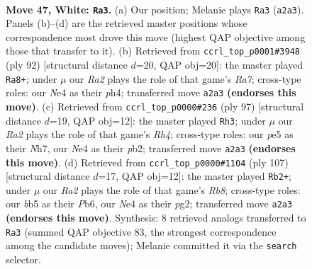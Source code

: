 \documentclass[11pt]{article}
\begin{document}
\clearpage

\begin{figure}[p]\centering
\begin{subfigure}{0.46\textwidth}\centering
\resizebox{\linewidth}{!}{%
\newchessgame
\chessboard[
  setfen={5r2/4k3/8/1b2p3/pP2N1K1/6P1/R7/8 w - - 7 47},
  showmover=false,
  pgfstyle=straightmove, color=movearrow, markmove={a2-a3}
]}
\caption{}
\end{subfigure}\hfill
\begin{subfigure}{0.46\textwidth}\centering
\resizebox{\linewidth}{!}{%
\newchessgame
\chessboard[
  setfen={7k/R7/8/p2p1K2/5P1p/6r1/2P5/8 w - - 0 47},
  showmover=false,
  pgfstyle=straightmove, color=movearrow, markmove={a7-a8}
]}
\caption{}
\end{subfigure}
\\[4pt]
\begin{subfigure}{0.46\textwidth}\centering
\resizebox{\linewidth}{!}{%
\newchessgame
\chessboard[
  setfen={2k5/1p3p1n/7P/p6r/8/4B3/1P6/K5R1 b - - 6 49},
  showmover=false,
  pgfstyle=straightmove, color=movearrow, markmove={h5-h3}
]}
\caption{}
\end{subfigure}\hfill
\begin{subfigure}{0.46\textwidth}\centering
\resizebox{\linewidth}{!}{%
\newchessgame
\chessboard[
  setfen={8/8/1p3kp1/1P6/7P/4R3/5KP1/1r6 b - - 0 54},
  showmover=false,
  pgfstyle=straightmove, color=movearrow, markmove={b1-b2}
]}
\caption{}
\end{subfigure}
\caption{\textbf{Move 47, White: \texttt{Ra3}.} (a) Our position; Melanie plays \texttt{Ra3} (\texttt{a2a3}). Panels (b)--(d) are the retrieved master positions whose correspondence most drove this move (highest QAP objective among those that transfer to it). (b) Retrieved from \texttt{ccrl\_top\_p0001\#3948} (ply 92) [structural distance $d$=20, QAP obj=20]: the master played \texttt{Ra8+}; under $\mu$ our \emph{Ra2} plays the role of that game's \emph{Ra7}; cross-type roles: our \emph{N}e4 as their \emph{p}h4; transferred move \texttt{a2a3} \textbf{(endorses this move)}. (c) Retrieved from \texttt{ccrl\_top\_p0000\#236} (ply 97) [structural distance $d$=19, QAP obj=12]: the master played \texttt{Rh3}; under $\mu$ our \emph{Ra2} plays the role of that game's \emph{Rh4}; cross-type roles: our \emph{p}e5 as their \emph{N}h7, our \emph{N}e4 as their \emph{p}b2; transferred move \texttt{a2a3} \textbf{(endorses this move)}. (d) Retrieved from \texttt{ccrl\_top\_p0000\#1104} (ply 107) [structural distance $d$=17, QAP obj=12]: the master played \texttt{Rb2+}; under $\mu$ our \emph{Ra2} plays the role of that game's \emph{Rb8}; cross-type roles: our \emph{b}b5 as their \emph{P}b6, our \emph{N}e4 as their \emph{p}g2; transferred move \texttt{a2a3} \textbf{(endorses this move)}. Synthesis: 8 retrieved analogs transferred to \texttt{Ra3} (summed QAP objective 83, the strongest correspondence among the candidate moves); Melanie committed it via the \texttt{search} selector.}
\label{fig:thought-m92}
\end{figure}
\end{document}
